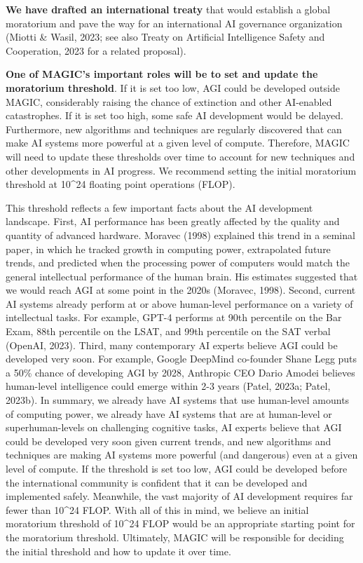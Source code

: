 \documentclass[12pt,a4paper]{article}
\begin{document}
\textbf{We have drafted an international treaty} that would establish a global moratorium and pave the way for an international AI governance organization (Miotti \& Wasil, 2023; see also Treaty on Artificial Intelligence Safety and Cooperation, 2023 for a related proposal).

\textbf{One of MAGIC's important roles will be to set and update the moratorium threshold}. If it is set too low, AGI could be developed outside MAGIC, considerably raising the chance of extinction and other AI-enabled catastrophes. If it is set too high, some safe AI development would be delayed. Furthermore, new algorithms and techniques are regularly discovered that can make AI systems more powerful at a given level of compute. Therefore, MAGIC will need to update these thresholds over time to account for new techniques and other developments in AI progress. We recommend setting the initial moratorium threshold at 10\^{}24 floating point operations (FLOP).

This threshold reflects a few important facts about the AI development landscape. First, AI performance has been greatly affected by the quality and quantity of advanced hardware. Moravec (1998) explained this trend in a seminal paper, in which he tracked growth in computing power, extrapolated future trends, and predicted when the processing power of computers would match the general intellectual performance of the human brain. His estimates suggested that we would reach AGI at some point in the 2020s (Moravec, 1998). Second, current AI systems already perform at or above human-level performance on a variety of intellectual tasks. For example, GPT-4 performs at 90th percentile on the Bar Exam, 88th percentile on the LSAT, and 99th percentile on the SAT verbal (OpenAI, 2023). Third, many contemporary AI experts believe AGI could be developed very soon. For example, Google DeepMind co-founder Shane Legg puts a 50\% chance of developing AGI by 2028, Anthropic CEO Dario Amodei believes human-level intelligence could emerge within 2-3 years (Patel, 2023a; Patel, 2023b). In summary, we already have AI systems that use human-level amounts of computing power, we already have AI systems that are at human-level or superhuman-levels on challenging cognitive tasks, AI experts believe that AGI could be developed very soon given current trends, and new algorithms and techniques are making AI systems more powerful (and dangerous) even at a given level of compute. If the threshold is set too low, AGI could be developed before the international community is confident that it can be developed and implemented safely. Meanwhile, the vast majority of AI development requires far fewer than 10\^{}24 FLOP. With all of this in mind, we believe an initial moratorium threshold of 10\^{}24 FLOP would be an appropriate starting point for the moratorium threshold. Ultimately, MAGIC will be responsible for deciding the initial threshold and how to update it over time.
\end{document}

